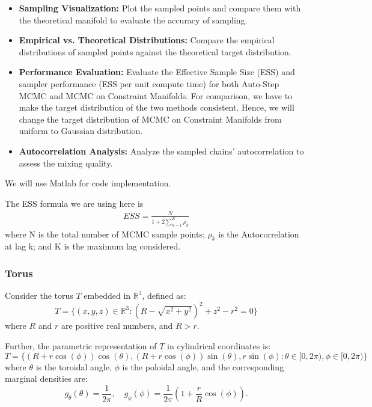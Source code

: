 \documentclass{article}
\begin{document}
\begin{itemize}
    \item \textbf{Sampling Visualization:} Plot the sampled points and compare them with the theoretical manifold to evaluate the accuracy of sampling.
    
    \item \textbf{Empirical vs. Theoretical Distributions:} Compare the empirical distributions of sampled points against the theoretical target distribution.
    
    \item \textbf{Performance Evaluation:} Evaluate the Effective Sample Size (ESS) and sampler performance (ESS per unit compute time) for both Auto-Step MCMC and MCMC on Constraint Manifolds. For comparison, we have to make the target distribution of the two methods consistent. Hence, we will change the target distribution of MCMC on Constraint Manifolds from uniform to Gaussian distribution.
    
    \item \textbf{Autocorrelation Analysis:} Analyze the sampled chains' autocorrelation to assess the mixing quality.
\end{itemize}

We will use Matlab for code implementation.

The ESS formula we are using here is 
\begin{align*}
    ESS= \frac{N}{1+ 2\sum_{k=1}^K \rho_k}
\end{align*}
where N is the total number of MCMC sample points; $\rho_k$ is the  Autocorrelation at lag k; and K is the maximum lag considered.

\subsubsection{Torus}
Consider the torus \(T\) embedded in \(\mathbb{R}^3\), defined as:
\[
T = \{(x, y, z) \in \mathbb{R}^3 : (R - \sqrt{x^2 + y^2})^2 + z^2 - r^2 = 0\}
\]
where \(R\) and \(r\) are positive real numbers, and \(R > r\).

Further, the parametric representation of \(T\) in cylindrical coordinates is:
\[
T = \{(R + r \cos(\phi))\cos(\theta), (R + r \cos(\phi))\sin(\theta), r \sin(\phi): \theta \in [0, 2\pi), \phi \in [0, 2\pi)\}
\]
where \(\theta\) is the toroidal angle, \(\phi\) is the poloidal angle, and the corresponding marginal densities are:
\[
g_\theta(\theta) = \frac{1}{2\pi}, \quad g_\phi(\phi) = \frac{1}{2\pi} \left(1 + \frac{r}{R} \cos(\phi)\right).
\]
\end{document}
